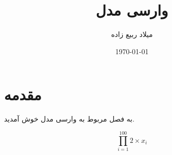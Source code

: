 \documentclass[12pt]{report}
\title{وارسی مدل}
\author{میلاد ربیع زاده}
\date{\today}
\begin{document}
\pagestyle{plain}
\setcounter{page}{1}

\maketitle

\tableofcontents

\newpage


\chapter{مقدمه}


به فصل مربوط به وارسی مدل خوش آمدید.

$$\prod_{i = 1}^{100} 2 \times x_i$$
\end{document}
